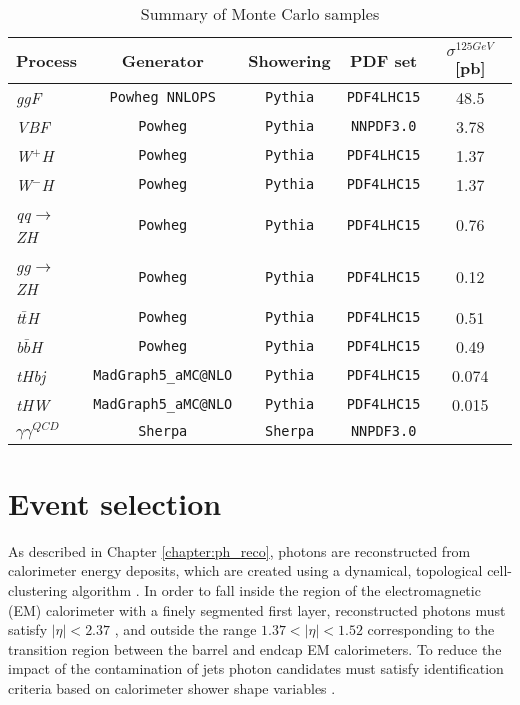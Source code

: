 \documentclass[a4paper, oneside, 11pt, openright]{book}
\begin{document}
			\begin{table}[tbp]
				\centering
				\begin{tabular}{lcccc}
					\toprule[1.5pt]
					Process					& Generator						& Showering			& PDF set				& $\sigma^{125 GeV}$ [pb]		\\
					\midrule
					\textit{ggF}			& \texttt{Powheg NNLOPS}		& \texttt{Pythia}	& \texttt{PDF4LHC15}	& 48.5				\\
					\textit{VBF}			& \texttt{Powheg}				& \texttt{Pythia}	& \texttt{NNPDF3.0}		& 3.78				\\
					\textit{W$^+$H}			& \texttt{Powheg}				& \texttt{Pythia}	& \texttt{PDF4LHC15}	& 1.37				\\
					\textit{W$^-$H}			& \texttt{Powheg}				& \texttt{Pythia}	& \texttt{PDF4LHC15}	& 1.37				\\
					\textit{qq$\to$ZH}		& \texttt{Powheg}				& \texttt{Pythia}	& \texttt{PDF4LHC15}	& 0.76				\\
					\textit{gg$\to$ZH}		& \texttt{Powheg}				& \texttt{Pythia}	& \texttt{PDF4LHC15}	& 0.12				\\
					\textit{t$\bar{t}$H}	& \texttt{Powheg}				& \texttt{Pythia}	& \texttt{PDF4LHC15}	& 0.51				\\
					\textit{b$\bar{b}$H}	& \texttt{Powheg}				& \texttt{Pythia}	& \texttt{PDF4LHC15}	& 0.49				\\
					\textit{tHbj}			& \texttt{MadGraph5\_aMC@NLO}	& \texttt{Pythia}	& \texttt{PDF4LHC15}	& 0.074				\\
					\textit{tHW}			& \texttt{MadGraph5\_aMC@NLO}	& \texttt{Pythia}	& \texttt{PDF4LHC15}	& 0.015				\\
					\midrule
					\textit{$\gamma\gamma^{QCD}$} &  \texttt{Sherpa}		& \texttt{Sherpa}	& \texttt{NNPDF3.0}		&					\\
					\bottomrule[1.5pt]	
				\end{tabular}
				\caption{Summary of Monte Carlo samples}
				\label{tab:MC_samples}
			\end{table}	
 	
 		\section{Event selection}\label{section:selection}
 			As described in Chapter \ref{chapter:ph_reco}, photons are reconstructed from calorimeter energy deposits, which are created using a dynamical, topological cell-clustering algorithm \cite{topo_cluster}. In order to fall inside the region of the electromagnetic (EM) calorimeter with a finely segmented first layer, reconstructed photons must satisfy $|\eta| < 2.37$ , and outside the range $1.37 < |\eta| < 1.52$ corresponding to the transition region between the barrel and endcap EM calorimeters. To reduce the impact of the contamination of jets photon candidates must satisfy identification criteria based on calorimeter shower shape variables \cite{Aad_2019}.
 			
\end{document}
